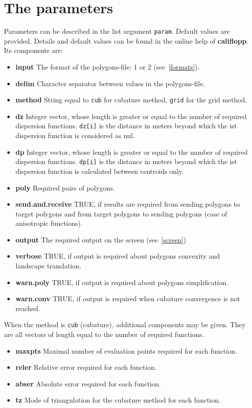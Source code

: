 \documentclass[a4paper,twoside,openright]{report}
\begin{document}
\section{The parameters}
Parameters  can be described in the list argument \texttt{param}.
Default values are provided. 
Details and default values can be found in
the online help  of \textbf{califlopp}.
Its components are:
\begin{itemize}
\item
\textbf{input}
The format of the polygons-file: 1 or 2 (see~\ref{formats}).
\item
\textbf{delim}
Character separator between values in the polygons-file.
\item
\textbf{method}
String equal to \texttt{cub} for cubature method, \texttt{grid} for the grid method. 
\item
\textbf{dz}
Integer vector, whose length is greater or equal to the number of required dispersion functions. \texttt{dz[i]} is the distance in meters beyond which the ist dispersion function is considered as nul. 
\item
\textbf{dp}
Integer vector, whose length is greater or equal to the number of required dispersion functions. \texttt{dp[i]} is the distance in meters beyond which the ist dispersion function is calculated between centroids only. 
\item
\textbf{poly}
Required pairs of polygons. 
\item
\textbf{send.and.receive}
TRUE, if results are required from sending polygons to target polygons and from target polygons to sending polygons (case of anisotropic functions). 
\item
\textbf{output}
The required output on the screen (see~\ref{screen})
\item
\textbf{verbose}
TRUE, if output is required about polygons convexity and landscape translation.
\item
\textbf{warn.poly}
TRUE, if output is required about polygons simplification.
\item
\textbf{warn.conv}
TRUE, if output is required when cubature convergence is not reached.
\end{itemize}
When the method is \texttt{cub} (cubature), additional components may be given. They are all vectors of length equal to the number of required functions. 
\begin{itemize}
\item
\textbf{maxpts}
Maximal number of evaluation points required for each function. 
\item
\textbf{reler}
Relative error required for each function. 
\item
\textbf{abser}
Absolute error required for each function. 
\item
\textbf{tz}
Mode of triangulation for the cubature method for each function.
\end{itemize}
\end{document}
